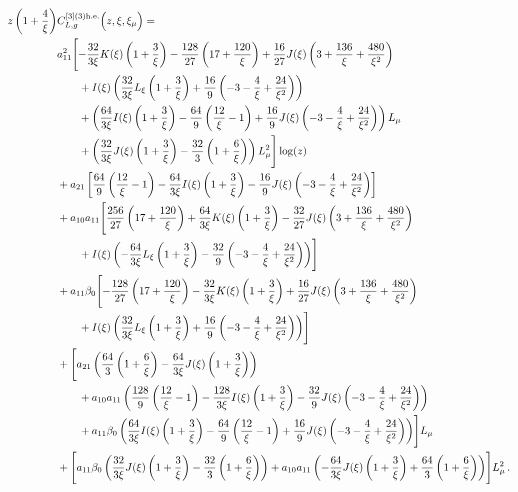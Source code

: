 \documentclass[a4paper]{article}
\begin{document}
\begin{align}
		z \left(1 + \frac{4}{\xi}\right) &C_{L,g}^{[3](3) \rm h.e.}\Bigl(z,\xi,\xi_\mu\Bigr)= \notag\\
		& a_{11}^2 \Biggl[ -\frac{32}{3 \xi} K(\xi) \left(1 + \frac{3}{\xi}\right) - \frac{128}{27} \left(17 + \frac{120}{\xi}\right) + \frac{16}{27} J(\xi) \left(3 + \frac{136}{\xi} + \frac{480}{\xi^2}\right) \notag\\
		&\qquad + I(\xi) \left(\frac{32}{3\xi} L_\xi \left(1 + \frac{3}{\xi}\right) + \frac{16}{9} \left(-3 - \frac{4}{\xi} + \frac{24}{\xi^2}\right)\right) \notag\\
	 	& \qquad + \left(\frac{64}{3\xi} I(\xi) \left(1 + \frac{3}{\xi}\right) - \frac{64}{9} \left(\frac{12}{\xi} - 1\right) + \frac{16}{9} J(\xi) \left(-3 - \frac{4}{\xi} + \frac{24}{\xi^2}\right)\right) L_\mu \notag\\
		& \qquad + \left(\frac{32}{3\xi} J(\xi) \left(1 + \frac{3}{\xi}\right) - \frac{32}{3} \left(1 + \frac{6}{\xi}\right)\right) L_\mu^2\Biggr] \log(z)\notag\\
		& + a_{21} \left[\frac{64}{9} \left(\frac{12}{\xi} - 1\right) -\frac{64}{3\xi} I(\xi)  \left(1 + \frac{3}{\xi}\right) - \frac{16}{9} J(\xi) \left(-3 - \frac{4}{\xi} + \frac{24}{\xi^2}\right)\right] \notag\\
		& + a_{10} a_{11} \Biggl[\frac{256}{27} \left(17 + \frac{120}{\xi}\right) + \frac{64}{3\xi} K(\xi) \left(1 + \frac{3}{\xi}\right) - \frac{32}{27} J(\xi) \left(3 + \frac{136}{\xi} + \frac{480}{\xi^2}\right) \notag\\
		& \qquad + I(\xi) \left(-\frac{64}{3\xi} L_\xi \left(1 + \frac{3}{\xi}\right) - \frac{32}{9} \left(-3 - \frac{4}{\xi} + \frac{24}{\xi^2}\right)\right)\Biggr] \notag\\
		& + a_{11} \beta_0 \Biggl[- \frac{128}{27} \left(17 + \frac{120}{\xi}\right) -\frac{32}{3\xi} K(\xi) \left(1 + \frac{3}{\xi}\right) + \frac{16}{27} J(\xi) \left(3 + \frac{136}{\xi} + \frac{480}{\xi^2}\right) \notag\\
		& \qquad+ I(\xi) \left(\frac{32}{3\xi} L_\xi \left(1 + \frac{3}{\xi}\right) + \frac{16}{9} \left(-3 - \frac{4}{\xi} + \frac{24}{\xi^2}\right)\right)\Biggr] \notag\\
		& + \Biggl[a_{21} \left(\frac{64}{3} \left(1 + \frac{6}{\xi} \right) -\frac{64}{3\xi} J(\xi) \left(1 + \frac{3}{\xi}\right) \right) \notag\\
		& \qquad + a_{10} a_{11} \left(\frac{128}{9} \left(\frac{12}{\xi} - 1\right) -\frac{128}{3\xi} I(\xi) \left(1 + \frac{3}{\xi}\right) - \frac{32}{9} J(\xi) \left(-3 - \frac{4}{\xi} + \frac{24}{\xi^2}\right)\right)\notag \\
		& \qquad + a_{11} \beta_0 \left(\frac{64}{3\xi} I(\xi) \left(1 + \frac{3}{\xi}\right) - \frac{64}{9} \left(\frac{12}{\xi} - 1\right) + \frac{16}{9} J(\xi) \left(-3 - \frac{4}{\xi} + \frac{24}{\xi^2}\right)\right)\Biggr] L_\mu \notag\\
		& + \Biggl[ a_{11} \beta_0 \left( \frac{32}{3\xi} J(\xi) \left(1 + \frac{3}{\xi}\right) - \frac{32}{3} \left(1 + \frac{6}{\xi}\right) \right)
		+ a_{10} a_{11} \left(-\frac{64}{3\xi} J(\xi) \left(1 + \frac{3}{\xi}\right) + \frac{64}{3} \left(1 + \frac{6}{\xi}\right) \right) \Biggr] L_\mu^2\,. \label{CL_g3}
	\end{align}
\end{document}

